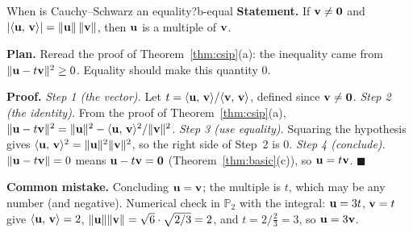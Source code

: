 \documentclass[11pt]{article}
\begin{document}
\begin{exmp}{When is Cauchy--Schwarz an equality?}{b-equal}
\textbf{Statement.} If $\mathbf{v}\neq\mathbf{0}$ and $|\langle \mathbf{u},\,\mathbf{v}\rangle|=\lVert\mathbf{u}\rVert\,\lVert\mathbf{v}\rVert$, then $\mathbf{u}$ is a multiple of $\mathbf{v}$.

\textbf{Plan.} Reread the proof of Theorem~\ref{thm:csip}(a): the inequality came from $\lVert\mathbf{u}-t\mathbf{v}\rVert^2\ge0$. Equality should make this quantity $0$.

\textbf{Proof.}
\emph{Step 1 (the vector).} Let $t=\langle \mathbf{u},\,\mathbf{v}\rangle/\langle \mathbf{v},\,\mathbf{v}\rangle$, defined since $\mathbf{v}\neq\mathbf{0}$.
\emph{Step 2 (the identity).} From the proof of Theorem~\ref{thm:csip}(a), $\lVert\mathbf{u}-t\mathbf{v}\rVert^2=\lVert\mathbf{u}\rVert^2-\langle \mathbf{u},\,\mathbf{v}\rangle^2/\lVert\mathbf{v}\rVert^2$.
\emph{Step 3 (use equality).} Squaring the hypothesis gives $\langle \mathbf{u},\,\mathbf{v}\rangle^2=\lVert\mathbf{u}\rVert^2\lVert\mathbf{v}\rVert^2$, so the right side of Step~2 is $0$.
\emph{Step 4 (conclude).} $\lVert\mathbf{u}-t\mathbf{v}\rVert=0$ means $\mathbf{u}-t\mathbf{v}=\mathbf{0}$ (Theorem~\ref{thm:basic}(c)), so $\mathbf{u}=t\mathbf{v}$. \qquad$\blacksquare$

\textbf{Common mistake.} Concluding $\mathbf{u}=\mathbf{v}$; the multiple is $t$, which may be any number (and negative). Numerical check in $\mathbb{P}_2$ with the integral: $\mathbf{u}=3t$, $\mathbf{v}=t$ give $\langle \mathbf{u},\,\mathbf{v}\rangle=2$, $\lVert\mathbf{u}\rVert\lVert\mathbf{v}\rVert=\sqrt{6}\cdot\sqrt{2/3}=2$, and $t=2\big/\tfrac23=3$, so $\mathbf{u}=3\mathbf{v}$.
\end{exmp}
\end{document}
